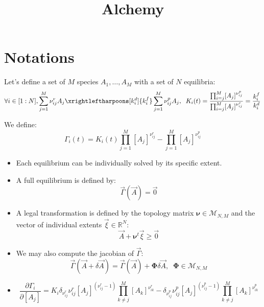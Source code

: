 \documentclass[aps,onecolumn,11pt]{revtex4}
\begin{document}
\title{Alchemy}
\maketitle

\section{Notations}

Let's define a set of $M$ species $A_1,\ldots,A_M$ with a set of $N$ equilibria:
\begin{equation}
	\forall i\in[1:N], \sum_{j=1}^M \nu_{ij}^r A_j \xrightleftharpoons[k^d_i]{k^f_i} \sum_{j=1}^{M} \nu_{ij}^p A_j, 
	\;\; K_i(t) = \dfrac{\prod_{i=j}^M [A_j]^{\nu^p_{ij}}}{\prod_{i=j}^M [A_j]^{\nu^r_{ij}}} = \dfrac{k^f_i}{k^d_i}
\end{equation}

We define:
\begin{equation}
	\Gamma_i(t) = K_i(t) \prod_{j=1}^M [A_j]^{\nu^r_{ij}} - \prod_{j=1}^M [A_j]^{\nu^p_{ij}}
\end{equation}

\begin{itemize}
\item Each equilibrium can be individually solved by its specific extent.

\item A full equilibrium is defined by:
\begin{equation}
	\vec{\Gamma}(\vec{A}) = \vec{0}
\end{equation}

\item A legal transformation is defined by the topology matrix $\bm{\nu} \in \mathcal{M}_{N,M}$ 
and the vector of individual extents $\vec{\xi} \in \mathbb{R}^N$:
\begin{equation}
	\vec{A} + \bm{\nu}^t \vec{\xi}  \geq \vec{0}
\end{equation}

\item
We may also compute the jacobian of $\vec{\Gamma}$:
\begin{equation}
	\vec{\Gamma}(\vec{A}+\delta\vec{A}) = \vec{\Gamma}(\vec{A}) + \bm{\Phi} \delta\vec{A}, \;\; \bm{\Phi} \in \mathcal{M}_{N,M}
\end{equation}

\item
\begin{equation}
	\dfrac{\partial \Gamma_i}{\partial [A_j]} 
	= K_i \delta_{\nu^r_{ij} } \nu^r_{ij} [A_j]^{(\nu^r_{ij}-1)} \prod_{k\not=j}^M [A_k]^{\nu^r_{ik}}
	- \delta_{\nu^p_{ij} } \nu^p_{ij} [A_j]^{(\nu^p_{ij}-1)} \prod_{k\not=j}^M [A_k]^{\nu^p_{ik}}
\end{equation}

\end{itemize}
\end{document}
